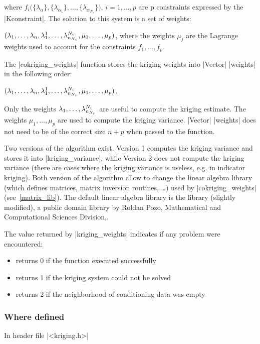 \documentclass[12pt,twoside]{report}
\begin{document}
\noindent where $f_i \Big( \{ \lambda_{\alpha} \}, \{\lambda_{\alpha_1} \},\ldots,\{\lambda_{\alpha_{N_v}} \} \Big)$, $i=1,\ldots,p$ are p constraints expressed by the |Kconstraint|. The solution to this system is a set of weights: 

\noindent $( \lambda_1,\ldots,\lambda_n,\lambda_1^1,\ldots, \lambda^{N_v}_{n_{\tiny N_v}},\mu_1,\ldots,\mu_p)$, where the weights $\mu_j$ are the Lagrange weights used to account for the constraints $f_1,\ldots,f_p$.

The |cokriging_weights| function stores the kriging weights into |Vector| |weights| in the following order:

\noindent $( \lambda_1,\ldots,\lambda_n,\lambda_1^1,\ldots, \lambda^{N_v}_{n_{\tiny N_v}},\mu_1,\ldots,\mu_p)$.

Only the weights $\lambda_1,\ldots,\lambda^{N_v}_{n_{\tiny N_v}}$ are useful to compute the kriging estimate. The weights $\mu_1,\ldots,\mu_p$ are used to compute the kriging variance.
|Vector| |weights| does not need to be of the correct size $n+p$ when passed to the function. 

Two versions of the algorithm exist. Version 1 computes the kriging variance and stores it into |kriging_variance|, while Version 2 does not compute the kriging variance (there are cases where the kriging variance is useless, e.g. in indicator kriging). 
Both version of the algorithm allow to change the linear algebra library (which defines matrices, matrix inversion routines, \ldots) used by |cokriging_weights| (see~\ref{matrix_lib}). 
The default linear algebra library is the library (slightly modified), a public domain library by Roldan Pozo, Mathematical and Computational Sciences Division,.

The value returned by |kriging_weights| indicates if any problem were encountered:
\begin{itemize}
\item returns 0 if the function executed successfully
\item returns 1 if the kriging system could not be solved
\item returns 2 if the neighborhood of conditioning data was empty
\end{itemize}



\htmlrule[CLEAR=all]  \subsubsection*{Where defined}
In header file |<kriging.h>|
\end{document}
